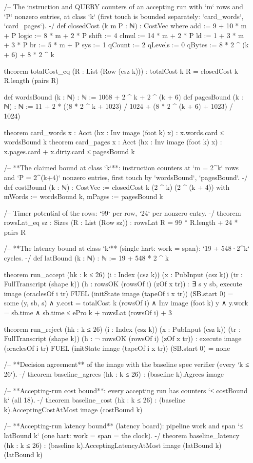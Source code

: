 \begin{leancode}
/-- The instruction and QUERY counters of an accepting run with `m` rows and `P`
nonzero entries, at class `k` (first touch is bounded separately: `card_words`,
`card_pages`). -/
def closedCost (k m P : ℕ) : CostVec where
  add := 9 + 10 * m + P
  logic := 8 * m + 2 * P
  shift := 4
  clmul := 14 * m + 2 * P
  ld := 1 + 3 * m + 3 * P
  br := 5 * m + P
  sys := 1
  qCount := 2
  qLevels := 0
  qBytes := 8 * 2 ^ (k + 6) + 8 * 2 ^ k

theorem totalCost_eq (R : List (Row (csz k))) :
    totalCost k R = closedCost k R.length (pairs R)

def wordsBound (k : ℕ) : ℕ := 1068 + 2 ^ k + 2 ^ (k + 6)
def pagesBound (k : ℕ) : ℕ :=
  11 + 2 * ((8 * 2 ^ k + 1023) / 1024 + (8 * 2 ^ (k + 6) + 1023) / 1024)

theorem card_words {x : Acct} (hx : Inv image (foot k) x) :
    x.words.card ≤ wordsBound k
theorem card_pages {x : Acct} (hx : Inv image (foot k) x) :
    x.pages.card + x.dirty.card ≤ pagesBound k

/-- **The claimed bound at class `k`**: instruction counters at `m = 2^k` rows and
`P = 2^(k+4)` nonzero entries, first touch by `wordsBound`, `pagesBound`. -/
def costBound (k : ℕ) : CostVec :=
  { closedCost k (2 ^ k) (2 ^ (k + 4)) with
    mWords := wordsBound k, mPages := pagesBound k }

/-- Timer potential of the rows: `99` per row, `24` per nonzero entry. -/
theorem rowsLat_eq {sz : Sizes} (R : List (Row sz)) :
    rowsLat R = 99 * R.length + 24 * pairs R

/-- **The latency bound at class `k`** (single hart: work = span): `19 + 548·2^k`
cycles. -/
def latBound (k : ℕ) : ℕ := 19 + 548 * 2 ^ k

theorem run_accept (hk : k ≤ 26) (i : Index (csz k)) (x : PubInput (csz k))
    (tr : FullTranscript (shape k)) (h : rowsOK (rowsOf i) (zOf x tr)) :
    ∃ s y sb, execute image (oraclesOf i tr) FUEL {} (initState image (tapeOf i x tr))
        (SB.start 0) {} = some (y, sb, s) ∧
      y.cost = totalCost k (rowsOf i) ∧ Inv image (foot k) y ∧ y.work = sb.time ∧
      sb.time ≤ ePro k + rowsLat (rowsOf i) + 3

theorem run_reject (hk : k ≤ 26) (i : Index (csz k)) (x : PubInput (csz k))
    (tr : FullTranscript (shape k)) (h : ¬ rowsOK (rowsOf i) (zOf x tr)) :
    execute image (oraclesOf i tr) FUEL {} (initState image (tapeOf i x tr))
      (SB.start 0) {} = none

/-- **Decision agreement** of the image with the baseline spec verifier
(every `k ≤ 26`). -/
theorem baseline_agrees (hk : k ≤ 26) : (baseline k).Agrees image

/-- **Accepting-run cost bound**: every accepting run has counters `≤ costBound k`
(all 18). -/
theorem baseline_cost (hk : k ≤ 26) :
    (baseline k).AcceptingCostAtMost image (costBound k)

/-- **Accepting-run latency bound** (latency board): pipeline work and span
`≤ latBound k` (one hart: work = span = the clock). -/
theorem baseline_latency (hk : k ≤ 26) :
    (baseline k).AcceptingLatencyAtMost image (latBound k) (latBound k)
\end{leancode}

